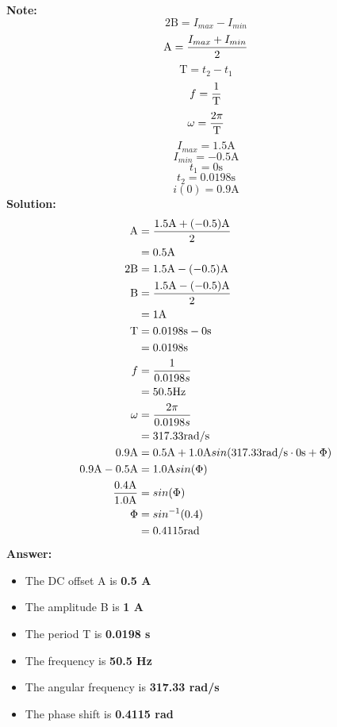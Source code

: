 \documentclass{article}
\begin{document}
\begin{addmargin}[1.5cm]{0em}
	\noindent
	\textbf{Note:} \\
	\begin{equation}
		2\text{B} = I_{max} - I_{min}
	\end{equation}	
	\begin{equation}
		\text{A} = {I_{max} + I_{min} \over 2}
	\end{equation}
	\begin{equation}
		\text{T} = t_2 - t_1
	\end{equation}
	\begin{equation}
		f = {1 \over \text{T}}
	\end{equation}
	\begin{equation}
		\omega = {2 \pi \over \text{T}}
	\end{equation}
		\[ I_{max} = 1.5 \text{A} \]
		\[ I_{min} = -0.5 \text{A} \]
		\[ t_1 = 0 \text{s} \]
		\[ t_2 = 0.0198 \text{s} \]
		\[ i(0) = 0.9 \text{A} \]
	\noindent
	\textbf{Solution:} \\
	\begin{align*}
		\text{A} &= {1.5 \text{A} + (-0.5) \text{A} \over 2} \\
		&= 0.5 \text{A} \\
		2\text{B} &= 1.5 \text{A} - (-0.5) \text{A} \\
		\text{B} &= {1.5 \text{A} - (-0.5) \text{A} \over 2} \\
		&= 1 \text{A} \\
		\text{T} &= 0.0198 \text{s} - 0 \text{s} \\
		&= 0.0198 \text{s} \\
		f &= {1 \over 0.0198 s} \\
		&= 50.5 \text{Hz} \\
		\omega &= {2 \pi \over 0.0198s} \\
		&= 317.33 \text{rad/s} \\
		0.9 \text{A} &= 0.5 \text{A} + 1.0 \text{A} sin(317.33 \text{rad/s} \cdot 0 \text{s} + \Phi) \\
		0.9 \text{A} - 0.5 \text{A} &= 1.0 \text{A} sin(\Phi) \\
		{0.4 \text{A} \over 1.0 \text{A}} &= sin(\Phi) \\
		\Phi &= sin^{-1}(0.4) \\
		&= 0.4115 \text{rad}
	\end{align*}
	\noindent
	\textbf{Answer:}
	\begin{itemize}
		\item The DC offset A is \textbf{0.5 A}
		\item The amplitude B is \textbf{1 A}
		\item The period T is \textbf{0.0198 s}
		\item The frequency is \textbf{50.5 Hz}
		\item The angular frequency is \textbf{317.33 rad/s}
		\item The phase shift is \textbf{0.4115 rad}
	\end{itemize}
\end{addmargin}
\end{document}

